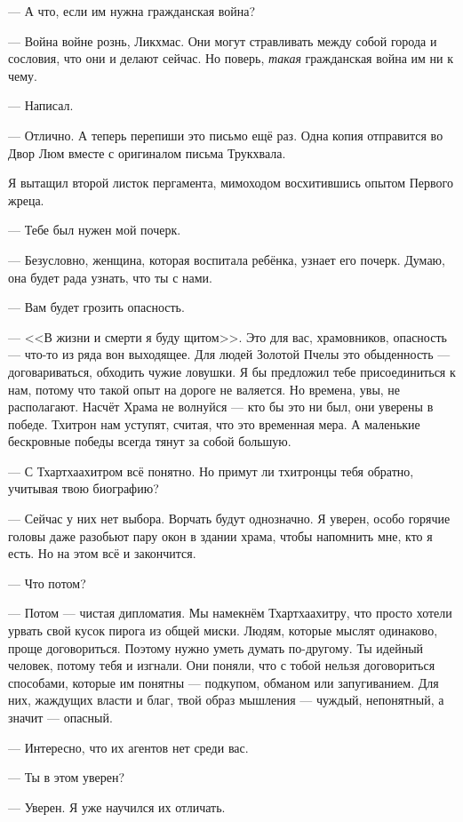 --- А что, если им нужна гражданская война?

--- Война войне рознь, Ликхмас.
Они могут стравливать между собой города и сословия, что они и делают сейчас.
Но поверь, \emph{такая} гражданская война им ни к чему.

--- Написал.

--- Отлично.
А теперь перепиши это письмо ещё раз.
Одна копия отправится во Двор Люм вместе с оригиналом письма Трукхвала.

Я вытащил второй листок пергамента, мимоходом восхитившись опытом Первого жреца.

--- Тебе был нужен мой почерк.

--- Безусловно, женщина, которая воспитала ребёнка, узнает его почерк.
Думаю, она будет рада узнать, что ты с нами.

--- Вам будет грозить опасность.

--- <<В жизни и смерти я буду щитом>>.
Это для вас, храмовников, опасность --- что-то из ряда вон выходящее.
Для людей Золотой Пчелы это обыденность --- договариваться, обходить чужие ловушки.
Я бы предложил тебе присоединиться к нам, потому что такой опыт на дороге не валяется.
Но времена, увы, не располагают.
Насчёт Храма не волнуйся --- кто бы это ни был, они уверены в победе.
Тхитрон нам уступят, считая, что это временная мера.
А маленькие бескровные победы всегда тянут за собой большую.

--- С Тхартхаахитром всё понятно.
Но примут ли тхитронцы тебя обратно, учитывая твою биографию?

--- Сейчас у них нет выбора.
Ворчать будут однозначно.
Я уверен, особо горячие головы даже разобьют пару окон в здании храма, чтобы напомнить мне, кто я есть.
Но на этом всё и закончится.

--- Что потом?

--- Потом --- чистая дипломатия.
Мы намекнём Тхартхаахитру, что просто хотели урвать свой кусок пирога из общей миски.
Людям, которые мыслят одинаково, проще договориться.
Поэтому нужно уметь думать по-другому.
Ты идейный человек, потому тебя и изгнали.
Они поняли, что с тобой нельзя договориться способами, которые им понятны --- подкупом, обманом или запугиванием.
Для них, жаждущих власти и благ, твой образ мышления --- чуждый, непонятный, а значит --- опасный.

--- Интересно, что их агентов нет среди вас.

--- Ты в этом уверен?

--- Уверен.
Я уже научился их отличать.

